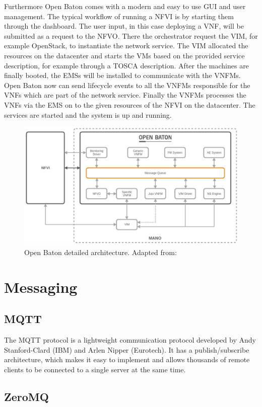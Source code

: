Furthermore Open Baton comes with a modern and easy to use \ac{GUI} and user management.
The typical workflow of running a \ac{NFVI} is by starting them through the dashboard.
The user input, in this case deploying a \ac{VNF}, will be submitted as a request to the \ac{NFVO}.
There the orchestrator request the \ac{VIM}, for example OpenStack, to instantiate the network service.
The \ac{VIM} allocated the resources on the datacenter and starts the \acp{VM} based on the provided service description, for example through a \ac{TOSCA} description.
After the machines are finally booted, the \acp{EMS} will be installed to communicate with the \acp{VNFM}.
Open Baton now can send lifecycle events to all the \acp{VNFM} responsible for the \acp{VNF} which are part of the network service.
Finally the \acp{VNFM} processes the \acp{VNF} via the \ac{EMS} on to the given resources of the \ac{NFVI} on the datacenter.
The services are started and the system is up and running.

\begin{figure}[H]
    \centering
    \includegraphics[width=\textwidth]{resources/images/open_baton_architecture.png}
    \caption[Open Baton detailed architecture]{Open Baton detailed architecture. Adapted from: \autocite{openBatonDoc}}
    \label{fig:open_baton_detailed_architecture}
\end{figure}

\section{Messaging}

\subsection{MQTT}
The \ac{MQTT} protocol is a lightweight communication protocol developed by Andy Stanford-Clard (IBM) and Arlen Nipper (Eurotech).\autocite{Edler:2014:MQTT}
It has a publish/subscribe architecture, which makes it easy to implement and allows thousands of remote clients to be connected to a single server at the same time.\autocite{lampkin:2012:mqtt}

\subsection{ZeroMQ}
\doit
